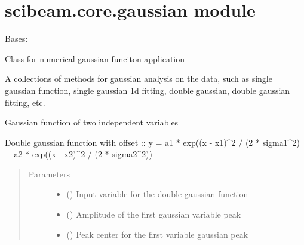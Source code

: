 \documentclass[letterpaper,10pt,english]{sphinxmanual}
\begin{document}
\section{scibeam.core.gaussian module}
\label{\detokenize{scibeam.core:module-scibeam.core.gaussian}}\label{\detokenize{scibeam.core:scibeam-core-gaussian-module}}

\begin{fulllineitems}
\label{\detokenize{scibeam.core:scibeam.core.gaussian.Gaussian}}
Bases: 

Class for numerical gaussian funciton application

A collections of methods for gaussian analysis on the data, such as
single gaussian function, single gaussian 1d fitting, double gaussian,
double gaussian fitting, etc.

\begin{fulllineitems}
\label{\detokenize{scibeam.core:scibeam.core.gaussian.Gaussian.doubleGaus}}
Gaussian function of two independent variables

Double gaussian function with offset ::
y = a1 * exp((x - x1)\textasciicircum{}2 / (2 * sigma1\textasciicircum{}2) + a2 * exp((x - x2)\textasciicircum{}2 / (2 * sigma2\textasciicircum{}2))
\begin{quote}\begin{description}
\item[{Parameters}] \leavevmode\begin{itemize}
\item {} 
 () \textendash{} Input variable for the double gaussian function

\item {} 
 () \textendash{} Amplitude of the first gaussian variable peak

\item {} 
 () \textendash{} Peak center for the first variable gaussian peak


\end{itemize}
\end{description}
\end{quote}
\end{fulllineitems}
\end{fulllineitems}
\end{document}
